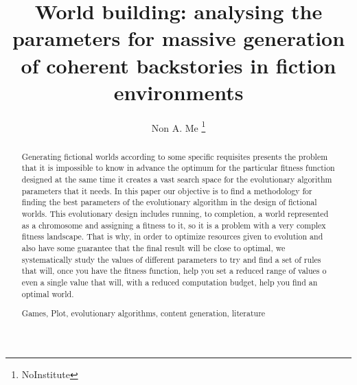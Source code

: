 \documentclass[runningheads,a4paper]{llncs}
\newcommand{\keywords}[1]{\par\addvspace\baselineskip
\noindent\keywordname\enspace\ignorespaces#1}
\begin{document}
\mainmatter  %

\title{World building: analysing the parameters for massive generation of coherent backstories in fiction environments}


%
%
\author{Non A. Me%
\thanks{NoInstitute}}
%


%
%

\maketitle


\begin{abstract}
Generating fictional worlds according to some specific requisites
presents the problem that it is impossible to know in advance the optimum for the
particular fitness function designed at the same time it creates a
vast search space for the evolutionary algorithm parameters that it
needs. In this paper our objective is to find a methodology for finding the
best parameters of the evolutionary algorithm in the design of
fictional worlds. This evolutionary design includes running, to
completion, a world represented as a chromosome and assigning a fitness to it, so it is a problem
with a very complex fitness landscape. That is why, in order to
optimize resources given to evolution and also have some guarantee
that the final result will be close to optimal, we systematically
study the values of different parameters to try and find a set of
rules that will, once you have the fitness function, help you set a
reduced range of values o even a single value that will, with a
reduced computation budget, help you find an optimal world.

\keywords{Games, Plot, evolutionary algorithms, content generation, literature}
\end{abstract}
\end{document}
